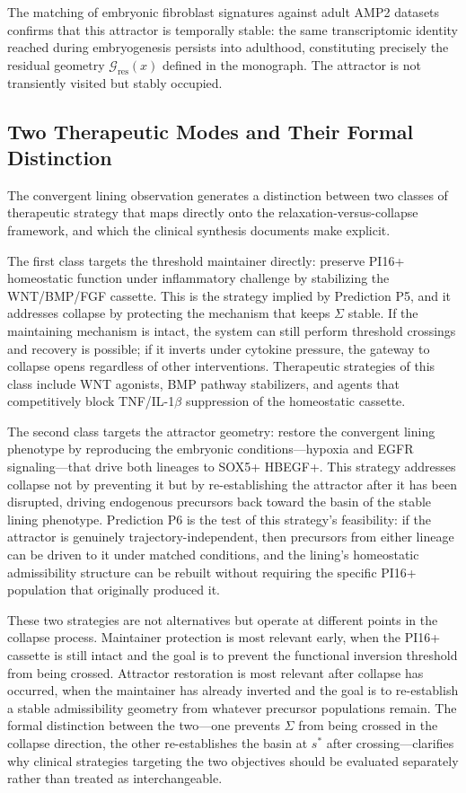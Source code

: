\documentclass[12pt, a4paper]{article}
\theoremstyle{definition}
\begin{document}
The matching of embryonic fibroblast signatures against adult AMP2 datasets confirms that this attractor is temporally stable: the same transcriptomic identity reached during embryogenesis persists into adulthood, constituting precisely the residual geometry $\mathcal{G}_{\mathrm{res}}(x)$ defined in the monograph. The attractor is not transiently visited but stably occupied.

\subsection{Two Therapeutic Modes and Their Formal Distinction}

The convergent lining observation generates a distinction between two classes of therapeutic strategy that maps directly onto the relaxation-versus-collapse framework, and which the clinical synthesis documents make explicit.

The first class targets the threshold maintainer directly: preserve PI16+ homeostatic function under inflammatory challenge by stabilizing the WNT/BMP/FGF cassette. This is the strategy implied by Prediction P5, and it addresses collapse by protecting the mechanism that keeps $\Sigma$ stable. If the maintaining mechanism is intact, the system can still perform threshold crossings and recovery is possible; if it inverts under cytokine pressure, the gateway to collapse opens regardless of other interventions. Therapeutic strategies of this class include WNT agonists, BMP pathway stabilizers, and agents that competitively block TNF/IL-1$\beta$ suppression of the homeostatic cassette.

The second class targets the attractor geometry: restore the convergent lining phenotype by reproducing the embryonic conditions---hypoxia and EGFR signaling---that drive both lineages to SOX5+ HBEGF+. This strategy addresses collapse not by preventing it but by re-establishing the attractor after it has been disrupted, driving endogenous precursors back toward the basin of the stable lining phenotype. Prediction P6 is the test of this strategy's feasibility: if the attractor is genuinely trajectory-independent, then precursors from either lineage can be driven to it under matched conditions, and the lining's homeostatic admissibility structure can be rebuilt without requiring the specific PI16+ population that originally produced it.

These two strategies are not alternatives but operate at different points in the collapse process. Maintainer protection is most relevant early, when the PI16+ cassette is still intact and the goal is to prevent the functional inversion threshold from being crossed. Attractor restoration is most relevant after collapse has occurred, when the maintainer has already inverted and the goal is to re-establish a stable admissibility geometry from whatever precursor populations remain. The formal distinction between the two---one prevents $\Sigma$ from being crossed in the collapse direction, the other re-establishes the basin at $s^*$ after crossing---clarifies why clinical strategies targeting the two objectives should be evaluated separately rather than treated as interchangeable.
\end{document}
